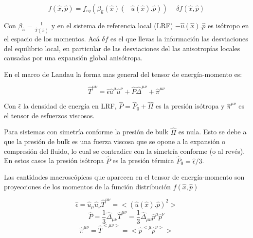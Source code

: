 \documentclass[11pt,a4paper]{article}
\begin{document}
\begin{equation}
f( \hat{x}, \hat{p})= f_{eq}(\beta_{\hat{u}}(\hat{x})(-\hat{u}(\hat{x}).\hat{p}))+{\delta}f( \hat{x}, \hat{p})
\label{expansion}
\end{equation}

Con $\beta_{\hat{u}}=\frac{1}{\hat{T}(\hat{x})}$ y en el sistema de referencia local (LRF) $-\hat{u}(\hat{x}).\hat{p}$ es isótropo en el espacio de los momentos. Acá ${\delta}f$ es el que llevas la información las desviaciones del equilibrio local, en particular de las desviaciones del las anisotropías locales causadas por una expansión global anisótropa.



En el marco de Landau la forma mas general del tensor de energía-momento es:

\begin{equation}
\hat{T}^{{\mu}{\nu}}= \hat{\epsilon}\hat{u}^{\mu}\hat{u}^{\nu}+\hat{P}\hat{\Delta}^{{\mu}{\nu}}+\hat{\pi}^{{\mu}{\nu}}
\end{equation}

Con $\hat{\epsilon}$ la densidad de energía en LRF, $\hat{P}=\hat{P}_{0}+\hat{\Pi}$ es la presión isótropa y $\hat{\pi}^{{\mu}{\nu}}$ es el tensor de esfuerzos viscosos.

Para sistemas con simetría conforme la presión de bulk $\hat{\Pi}$ es nula. Esto se debe a que la presión de bulk es una fuerza viscosa que se opone a la expansión o compresión del fluido, lo cual se contradice con la simetría conforme (o al revés). En estos casos la presión isótropa  $\hat{P}$ es la presión térmica $\hat{P}_{0}=\hat{\epsilon}/3$.

Las cantidades macroscópicas que aparecen en el tensor de energía-momento son proyecciones de los momentos de la función distribución $f( \hat{x}, \hat{p})$

\begin{equation}
\hat{\epsilon}=\hat{u}_{\mu}\hat{u}_{\nu}\hat{T}^{{\mu}{\nu}}=<(\hat{u}(\hat{x}).\hat{p})^2>
\end{equation}
\begin{equation}
\hat{P}=\frac{1}{3}\hat{\Delta}_{{\mu}{\nu}}\hat{T}^{{\mu}{\nu}}= \frac{1}{3}\hat{\Delta}_{{\mu}{\nu}}\hat{p}^{\mu}\hat{p}^{\nu}
\end{equation}
\begin{equation}
\hat{\pi}^{{\mu}{\nu}}= \hat{T}^{<{\mu}{\nu}>}=<\hat{p}^{<\mu}\hat{p}^{\nu>}>
\end{equation}
\end{document}
